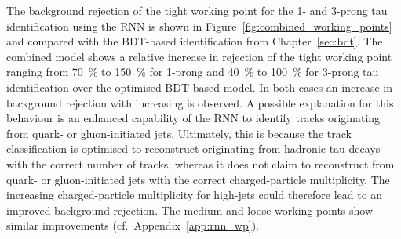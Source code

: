 The background rejection of the tight working point for the 1- and 3-prong tau
identification using the RNN is shown in
Figure~\ref{fig:combined_working_points} and compared with the BDT-based
identification from Chapter~\ref{sec:bdt}. The combined model shows a relative
increase in rejection of the tight working point ranging from \SI{70}{\percent}
to \SI{150}{\percent} for 1-prong and \SI{40}{\percent} to \SI{100}{\percent}
for 3-prong tau identification over the optimised BDT-based model. In both cases
an increase in background rejection with increasing \tauhadvis \pt is observed.
A possible explanation for this behaviour is an enhanced capability of the RNN
to identify tracks originating from quark- or gluon-initiated jets. Ultimately,
this is because the track classification is optimised to reconstruct \tauhadvis
originating from hadronic tau decays with the correct number of tracks, whereas
it does not claim to reconstruct \tauhadvis from quark- or gluon-initiated jets
with the correct charged-particle multiplicity. The increasing charged-particle
multiplicity for high-\pt jets could therefore lead to an improved background
rejection. The medium and loose working points show similar improvements (cf.\
Appendix~\ref{app:rnn_wp}).

